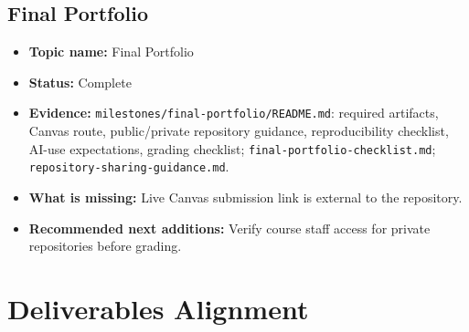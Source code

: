 \documentclass[
  letterpaper,
  DIV=11,
  numbers=noendperiod,
  oneside]{scrreprt}
\providecommand{\tightlist}{%
  \setlength{\itemsep}{0pt}\setlength{\parskip}{0pt}}
\begin{document}
\subsection{Final Portfolio}\label{final-portfolio}

\begin{itemize}
\tightlist
\item
  \textbf{Topic name:} Final Portfolio
\item
  \textbf{Status:} Complete
\item
  \textbf{Evidence:} \texttt{milestones/final-portfolio/README.md}:
  required artifacts, Canvas route, public/private repository guidance,
  reproducibility checklist, AI-use expectations, grading checklist;
  \texttt{final-portfolio-checklist.md};
  \texttt{repository-sharing-guidance.md}.
\item
  \textbf{What is missing:} Live Canvas submission link is external to
  the repository.
\item
  \textbf{Recommended next additions:} Verify course staff access for
  private repositories before grading.
\end{itemize}

\section{Deliverables Alignment}\label{deliverables-alignment}
\end{document}
